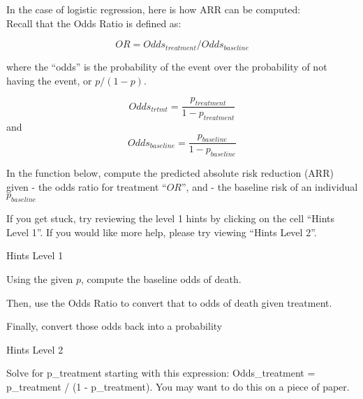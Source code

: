 \documentclass[11pt]{article}
\begin{document}
In the case of logistic regression, here is how ARR can be computed:\\
Recall that the Odds Ratio is defined as:

\[OR = Odds_{treatment} / Odds_{baseline}\]

where the ``odds'' is the probability of the event over the probability
of not having the event, or \(p/(1-p)\).

\[Odds_{trtmt} = \frac{p_{treatment}}{1- p_{treatment}}\] and
\[Odds_{baseline} = \frac{p_{baseline}}{1- p_{baseline}}\]

In the function below, compute the predicted absolute risk reduction
(ARR) given - the odds ratio for treatment ``\(OR\)'', and - the
baseline risk of an individual \(p_{baseline}\)

If you get stuck, try reviewing the level 1 hints by clicking on the
cell ``Hints Level 1''. If you would like more help, please try viewing
``Hints Level 2''.

     Hints Level 1

Using the given \(p\), compute the baseline odds of death.

Then, use the Odds Ratio to convert that to odds of death given
treatment.

Finally, convert those odds back into a probability

     Hints Level 2

Solve for p\_treatment starting with this expression: Odds\_treatment =
p\_treatment / (1 - p\_treatment). You may want to do this on a piece of
paper.
\end{document}
